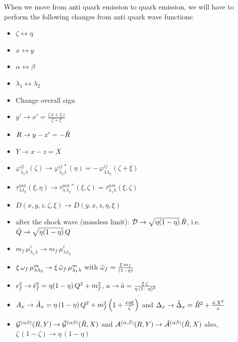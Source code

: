 \documentclass[9pt]{article}
\numberwithin{equation}{section}
\begin{document}
\begin{enumerate}
When we move from anti quark emission to quark emission, we will have to perform the following changes from anti quark wave functions:
\begin{itemize}
    \item $\zeta \leftrightarrow \eta$
    \item $x\leftrightarrow y$
    \item $\alpha \leftrightarrow \beta$
    \item $\lambda_{1}\leftrightarrow \lambda_{2}$
    \item Change overall sign
    \item $y'\rightarrow x' = \frac{\zeta\,x + \xi\, z}{\zeta + \xi}$
    \item $R \rightarrow y-x' = -\Tilde{R}$
    \item $Y \rightarrow x-z  = X$
    \item $\varphi^{ij}_{\lambda_{1}\lambda}(\zeta) \rightarrow \varphi^{ij\,*}_{\lambda_{2}\lambda}(\eta) = -\,\varphi^{ij}_{\lambda\lambda_{2}}(\zeta+\xi)$
    \item $\tau^{mn}_{\lambda\lambda_{2}}(\xi,\eta) \rightarrow \tau^{mn\,*}_{\lambda\,\lambda_{1}}(\xi,\zeta) = \tau^{nm}_{\lambda_{1}\lambda}(\xi,\zeta)$
    \item $D(x,y,z,\zeta, \xi) \rightarrow D(y,x,z,\eta,\xi)$
    \item after the shock wave (massless limit): $\mathcal{D}\rightarrow\sqrt{\eta(1-\eta)}\,\Tilde{R}$, i.e.\ $\Tilde{Q}\rightarrow\sqrt{\eta(1-\eta)}\,Q$
    \item $m_{f}\,\mu^{i}_{\lambda_{1}\lambda} \rightarrow m_{f}\,\mu^{i}_{\lambda\lambda_{2}} $
    \item $\xi\, \omega_{f}\,\mu^{m}_{\lambda\lambda_{2}} \rightarrow \xi\, \Tilde{\omega}_{f}\,\mu^{m}_{\lambda_{1}\lambda}$ with $\Tilde{\omega}_{f} = \frac{\xi\,m_{f}}{(1-\eta)}$
    \item $\epsilon^{2}_{f} \rightarrow \Tilde{\epsilon}^{2}_{f} = \eta(1-\eta)\, Q^{2} + m^{2}_{f}$, $a \rightarrow \Tilde{a} = \frac{\xi\,\zeta}{\eta\, (1-\eta)^{2}}$
    \item $A_{x} \rightarrow \Tilde{A}_{x} = \eta\,(1-\eta)\,Q^{2} + m^{2}_{f}\left(1+\frac{x\eta\xi}{\zeta}\right)$ and $\Delta_{x} \rightarrow \Tilde{\Delta}_{x} = \Tilde{R}^{2} + \frac{\Tilde{a}\,X^{2}}{x}$
    \item $\mathcal{G}^{(\alpha\beta)}(R,Y) \rightarrow \mathcal{\Tilde{G}}^{(\alpha\beta)}(\Tilde{R},X) $ and $\mathcal{A}^{(\alpha,\beta)}(R,Y) \rightarrow \mathcal{\Tilde{A}}^{(\alpha\beta)}(\Tilde{R},X)$ also, $\zeta\,(1-\zeta) \rightarrow \eta\,(1-\eta)$

\end{itemize}
\end{enumerate}
\end{document}
